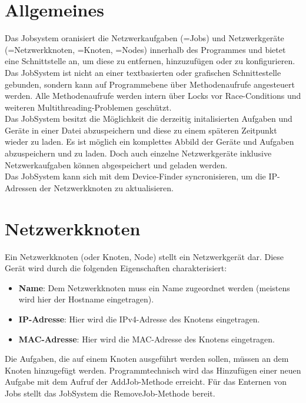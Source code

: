 \documentclass[12pt,a4paper]{report}
\begin{document}
\begin{onehalfspace}
\section{Allgemeines}

Das Jobsystem oranisiert die Netzwerkaufgaben (=Jobs) und Netzwerkgeräte (=Netzwerkknoten, =Knoten, =Nodes) innerhalb des Programmes und bietet eine Schnittstelle an, um diese zu entfernen, hinzuzufügen oder zu konfigurieren. Das JobSystem ist nicht an einer textbasierten oder grafischen Schnittestelle gebunden, sondern kann auf Programmebene über Methodenaufrufe angesteuert werden. Alle Methodenaufrufe werden intern über Locks vor Race-Conditions und weiteren Multithreading-Problemen geschützt.\\
Das JobSystem besitzt die Möglichkeit die derzeitig initalisierten Aufgaben und Geräte in einer Datei abzuspeichern und diese zu einem späteren Zeitpunkt wieder zu laden. Es ist möglich ein komplettes Abbild der Geräte und Aufgaben abzuspeichern und zu laden. Doch auch einzelne Netzwerkgeräte inklusive Netzwerkaufgaben können abgespeichert und geladen werden.\\
Das JobSystem kann sich mit dem Device-Finder syncronisieren, um die IP-Adressen der Netzwerkknoten zu aktualisieren.

\section{Netzwerkknoten}

Ein Netzwerkknoten (oder Knoten, Node)  stellt ein Netzwerkgerät dar. Diese Gerät wird durch die folgenden Eigenschaften charakterisiert:

\begin{itemize}
\item \textbf{Name}: Dem Netzwerkknoten muss ein Name zugeordnet werden (meistens wird hier der Hostname eingetragen).
\item \textbf{IP-Adresse}: Hier wird die IPv4-Adresse des Knotens eingetragen.
\item \textbf{MAC-Adresse}: Hier wird die MAC-Adresse des Knotens eingetragen.
\end{itemize}

Die Aufgaben, die auf einem Knoten ausgeführt werden sollen, müssen an dem Knoten hinzugefügt werden. Programmtechnisch wird das Hinzufügen einer neuen Aufgabe mit dem Aufruf der AddJob-Methode erreicht. Für das Enternen von Jobs stellt das JobSystem die RemoveJob-Methode bereit.


\end{onehalfspace}
\end{document}
